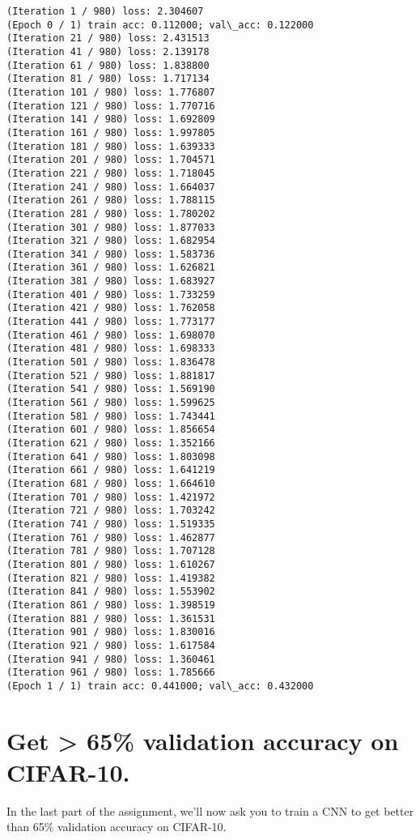 \documentclass[11pt]{article}
\begin{document}
    \begin{Verbatim}[commandchars=\\\{\}]
(Iteration 1 / 980) loss: 2.304607
(Epoch 0 / 1) train acc: 0.112000; val\_acc: 0.122000
(Iteration 21 / 980) loss: 2.431513
(Iteration 41 / 980) loss: 2.139178
(Iteration 61 / 980) loss: 1.838800
(Iteration 81 / 980) loss: 1.717134
(Iteration 101 / 980) loss: 1.776807
(Iteration 121 / 980) loss: 1.770716
(Iteration 141 / 980) loss: 1.692809
(Iteration 161 / 980) loss: 1.997805
(Iteration 181 / 980) loss: 1.639333
(Iteration 201 / 980) loss: 1.704571
(Iteration 221 / 980) loss: 1.718045
(Iteration 241 / 980) loss: 1.664037
(Iteration 261 / 980) loss: 1.788115
(Iteration 281 / 980) loss: 1.780202
(Iteration 301 / 980) loss: 1.877033
(Iteration 321 / 980) loss: 1.682954
(Iteration 341 / 980) loss: 1.583736
(Iteration 361 / 980) loss: 1.626821
(Iteration 381 / 980) loss: 1.683927
(Iteration 401 / 980) loss: 1.733259
(Iteration 421 / 980) loss: 1.762058
(Iteration 441 / 980) loss: 1.773177
(Iteration 461 / 980) loss: 1.698070
(Iteration 481 / 980) loss: 1.698333
(Iteration 501 / 980) loss: 1.836478
(Iteration 521 / 980) loss: 1.881817
(Iteration 541 / 980) loss: 1.569190
(Iteration 561 / 980) loss: 1.599625
(Iteration 581 / 980) loss: 1.743441
(Iteration 601 / 980) loss: 1.856654
(Iteration 621 / 980) loss: 1.352166
(Iteration 641 / 980) loss: 1.803098
(Iteration 661 / 980) loss: 1.641219
(Iteration 681 / 980) loss: 1.664610
(Iteration 701 / 980) loss: 1.421972
(Iteration 721 / 980) loss: 1.703242
(Iteration 741 / 980) loss: 1.519335
(Iteration 761 / 980) loss: 1.462877
(Iteration 781 / 980) loss: 1.707128
(Iteration 801 / 980) loss: 1.610267
(Iteration 821 / 980) loss: 1.419382
(Iteration 841 / 980) loss: 1.553902
(Iteration 861 / 980) loss: 1.398519
(Iteration 881 / 980) loss: 1.361531
(Iteration 901 / 980) loss: 1.830016
(Iteration 921 / 980) loss: 1.617584
(Iteration 941 / 980) loss: 1.360461
(Iteration 961 / 980) loss: 1.785666
(Epoch 1 / 1) train acc: 0.441000; val\_acc: 0.432000

    \end{Verbatim}

    \hypertarget{get-65-validation-accuracy-on-cifar-10.}{%
\section{Get \textgreater{} 65\% validation accuracy on
CIFAR-10.}\label{get-65-validation-accuracy-on-cifar-10.}}

In the last part of the assignment, we'll now ask you to train a CNN to
get better than 65\% validation accuracy on CIFAR-10.
\end{document}

